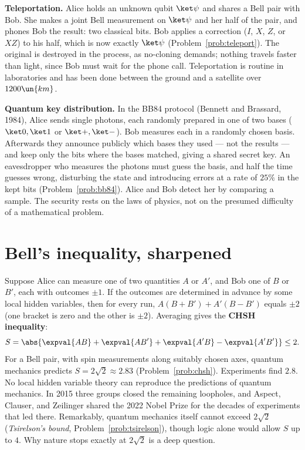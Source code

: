 \textbf{Teleportation.} Alice holds an unknown qubit $\ket\psi$ and shares a Bell pair with Bob. She makes a joint Bell measurement on $\ket\psi$ and her half of the pair, and phones Bob the result: two classical bits. Bob applies a correction ($I$, $X$, $Z$, or $XZ$) to his half, which is now exactly $\ket\psi$ (Problem~\ref{prob:teleport}). The original is destroyed in the process, as no-cloning demands; nothing travels faster than light, since Bob must wait for the phone call. Teleportation is routine in laboratories and has been done between the ground and a satellite over $1200\un{km}$.

\textbf{Quantum key distribution.} In the BB84 protocol (Bennett and Brassard, 1984), Alice sends single photons, each randomly prepared in one of two bases ($\ket0,\ket1$ or $\ket+,\ket-$). Bob measures each in a randomly chosen basis. Afterwards they announce publicly which bases they used --- not the results --- and keep only the bits where the bases matched, giving a shared secret key. An eavesdropper who measures the photons must guess the basis, and half the time guesses wrong, disturbing the state and introducing errors at a rate of $25\%$ in the kept bits (Problem~\ref{prob:bb84}). Alice and Bob detect her by comparing a sample. The security rests on the laws of physics, not on the presumed difficulty of a mathematical problem.

\section{Bell's inequality, sharpened}
\label{sec:chsh}

Suppose Alice can measure one of two quantities $A$ or $A'$, and Bob one of $B$ or $B'$, each with outcomes $\pm1$. If the outcomes are determined in advance by some local hidden variables, then for every run, $A(B+B') + A'(B-B')$ equals $\pm2$ (one bracket is zero and the other is $\pm2$). Averaging gives the \textbf{CHSH inequality}:
\[
  S = \abs{\expval{AB} + \expval{AB'} + \expval{A'B} - \expval{A'B'}}\le 2.
\]
For a Bell pair, with spin measurements along suitably chosen axes, quantum mechanics predicts $S = 2\sqrt2\approx2.83$ (Problem~\ref{prob:chsh}). Experiments find $2.8$. No local hidden variable theory can reproduce the predictions of quantum mechanics. In 2015 three groups closed the remaining loopholes, and Aspect, Clauser, and Zeilinger shared the 2022 Nobel Prize for the decades of experiments that led there. Remarkably, quantum mechanics itself cannot exceed $2\sqrt2$ (\emph{Tsirelson's bound}, Problem~\ref{prob:tsirelson}), though logic alone would allow $S$ up to $4$. Why nature stops exactly at $2\sqrt2$ is a deep question.

